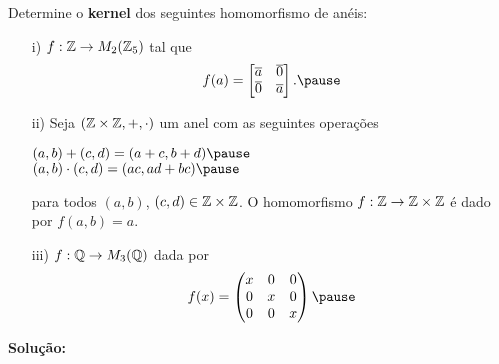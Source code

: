 \documentclass{beamer}
\begin{document}
    \begin{frame}
        \begin{exemplos}
            Determine o \textbf{kernel} dos seguintes homomorfismo de anéis:
            \begin{enumerate}
                \item[i)] $f : \mathbb{Z} \to M_2(\mathbb{Z}_5)$ \pause tal que\pause
                \[
                    f(a) = \begin{bmatrix}
                        \overline{a} & \overline{0}\\
                        \overline{0} & \overline{a}
                    \end{bmatrix}.\pause
                \]

                \item[ii)] Seja $(\mathbb{Z}\times\mathbb{Z}, +, \cdot)$ \pause um anel com as seguintes opera\c{c}\~oes\pause
                \begin{center}
                    $(a, b) + (c, d) = (a + c, b + d)\pause$\\
                    $(a, b)\cdot (c, d) = (ac, ad + bc)\pause$
                \end{center}
                para todos $(a, b)$, $(c, d) \in \mathbb{Z}\times\mathbb{Z}$. \pause
                O homomorfismo $ f : \mathbb{Z} \to \mathbb{Z} \times \mathbb{Z}$ é dado por $f(a, b) = a$.
            \end{enumerate}
        \end{exemplos}
    \end{frame}

    \begin{frame}
        \begin{exemplos}
            \begin{enumerate}
                \item[iii)] $f : \mathbb{Q} \to M_3(\mathbb{Q})$ \pause dada por\pause
                \[
                    f(x) = \begin{pmatrix}
                        x & 0 & 0\\
                        0 & x & 0\\
                        0 & 0 & x
                    \end{pmatrix}\pause
                \]
            \end{enumerate}
        \end{exemplos}

        \noindent \textbf{Solução:}
        \vspace{3cm}
    \end{frame}
\end{document}
